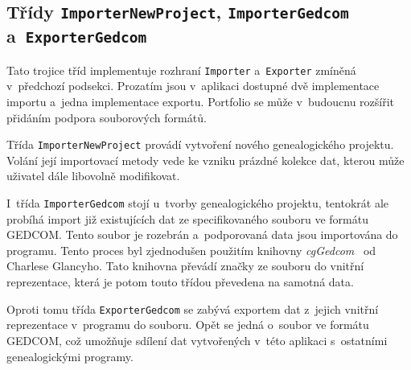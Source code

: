 		\subsection*{Třídy \texttt{ImporterNewProject}, \texttt{ImporterGedcom} a~\texttt{ExporterGedcom}}
		Tato trojice tříd implementuje rozhraní \texttt{Importer} a~\texttt{Exporter} zmíněná v~předchozí podsekci. Prozatím jsou v~aplikaci dostupné dvě implementace importu a~jedna implementace exportu. Portfolio se může v~budoucnu rozšířit přidáním podpora souborových formátů. \par
		Třída \texttt{ImporterNewProject} provádí vytvoření nového genealogického projektu. Volání její importovací metody vede ke vzniku prázdné kolekce dat, kterou může uživatel dále libovolně modifikovat. \par
		I~třída \texttt{ImporterGedcom} stojí u~tvorby genealogického projektu, tentokrát ale probíhá import již existujících dat ze specifikovaného souboru ve formátu GEDCOM. Tento soubor je rozebrán a~podporovaná data jsou importována do programu. Tento proces byl zjednodušen použitím knihovny \emph{cgGedcom}~\cite{bib:LibCgGedcom} od Charlese Glancyho. Tato knihovna převádí značky ze souboru do vnitřní reprezentace, která je potom touto třídou převedena na samotná data. \par
		Oproti tomu třída \texttt{ExporterGedcom} se zabývá exportem dat z~jejich vnitřní reprezentace v~programu do souboru. Opět se jedná o~soubor ve formátu GEDCOM, což umožňuje sdílení dat vytvořených v~této aplikaci s~ostatními genealogickými programy. \par
		
